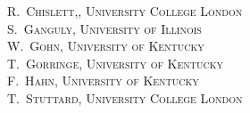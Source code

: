 
\textsc{
\medskip
\hspace*{3.0 cm} R.~Chislett,, University College London\\
\medskip
\hspace*{3.0 cm} S.~Ganguly, University of Illinois \\
\medskip
\hspace*{3.0 cm} W.~Gohn, University of Kentucky \\
\medskip
\hspace*{3.0 cm} T.~Gorringe, University of Kentucky \\
\medskip
\hspace*{3.0 cm} F.~Hahn, University of Kentucky \\
\medskip
\hspace*{3.0 cm} T.~Stuttard, University College London
}